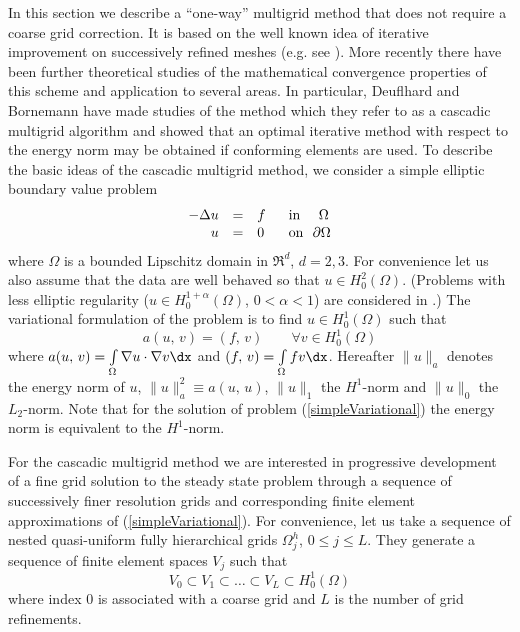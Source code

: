 In this section we describe a ``one-way'' multigrid method that
does not require a coarse grid correction. It is based on
the well known idea of iterative improvement on successively refined
meshes
(e.g. see \cite{Wac66}). More recently
there have been further theoretical studies of the mathematical
convergence
properties of this scheme and application to several areas. In
particular, Deuflhard and Bornemann \cite{Deu94,BD96} have made studies of
the
method which they refer to as a  cascadic multigrid algorithm and showed
that
an optimal iterative method with respect to the energy norm may be
obtained if conforming elements are used. To describe the basic ideas
of the cascadic multigrid method, we consider a simple elliptic boundary
value problem
\begin{equation}
  \label{simpleProblem}
  \begin{array}{rcll}
    -\Delta u &=& f & \mbox{~~in~~} ~~\Omega \\[.1ex]
    u &=& 0 & \mbox{~~on~~} {\partial}\Omega
  \end{array}
\end{equation}
where $\Omega$ is a bounded Lipschitz domain in $\Re^d$, $d=2,3$.
For convenience let us also assume that the data are well behaved so
that
$u \in H^2_0(\Omega)$. (Problems with less
elliptic regularity ($u\in H^{1+\alpha}_0(\Omega)$, $0< \alpha< 1$)
are considered in \cite{BD96}.) The variational formulation of the
problem
is to find $u \in H^1_0(\Omega)$ such that
\begin{equation}
     \label{simpleVariational}
        a(u,\, v) = (f,\, v) \qquad \forall v \in H^1_0(\Omega)
\end{equation}
where $a(u,\, v) = \int\limits_{\Omega} \nabla u \cdot \nabla v \dx$ and
$(f,\, v) = \int\limits_{\Omega} f v\dx$. Hereafter
$\| u \|_a$ denotes the energy norm of $u$, $\| u \|_a^2 \equiv a(u,\,
u)$,
$\| u \|_1$ the $H^1$-norm and $\| u \|_0$ the $L_2$-norm. Note that
for the solution of problem (\ref{simpleVariational}) the energy norm is
equivalent
to the $H^1$-norm.

For the cascadic multigrid method we are interested in progressive
development of a fine grid solution to the steady state problem through
a
sequence of successively finer resolution grids and corresponding
finite
element approximations of (\ref{simpleVariational}). For convenience,
let
us take a sequence of nested  quasi-uniform fully
hierarchical grids $\Omega_j^h$, $0\le j \le L$. They generate a
sequence of finite element spaces $V_j$ such that
$$
V_0 \subset V_1 \subset \ldots \subset V_L \subset H^1_0(\Omega)
$$
where index $0$ is associated with a coarse grid and $L$ is the
number of grid refinements.

